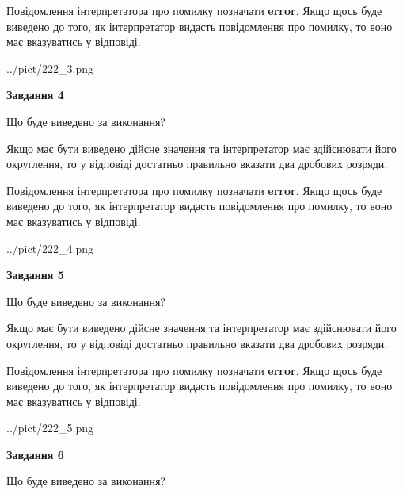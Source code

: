 \documentclass[12pt, ukrainian]{article}
\begin{document}
{\begin {Large}
Повідомлення інтерпретатора про помилку позначати \textbf{error}.
Якщо щось буде виведено до того, як інтерпретатор видасть повідомлення про помилку, 
то воно має вказуватись у відповіді. \par

\begin{center}
	{../pict/222_3.png}
\end{center}
\newpage

{\begin {center}\textbf{Завдання 4}\end {center}}\par
Що буде виведено за виконання? \par

Якщо має бути виведено дійсне значення та інтерпретатор має здійснювати його округлення, 
то у відповіді достатньо правильно вказати два дробових розряди.

Повідомлення інтерпретатора про помилку позначати \textbf{error}.
Якщо щось буде виведено до того, як інтерпретатор видасть повідомлення про помилку, 
то воно має вказуватись у відповіді. \par

\begin{center}
	{../pict/222_4.png}
\end{center}
\newpage

{\begin {center}\textbf{Завдання 5}\end {center}}\par
Що буде виведено за виконання? \par

Якщо має бути виведено дійсне значення та інтерпретатор має здійснювати його округлення, 
то у відповіді достатньо правильно вказати два дробових розряди.

Повідомлення інтерпретатора про помилку позначати \textbf{error}.
Якщо щось буде виведено до того, як інтерпретатор видасть повідомлення про помилку, 
то воно має вказуватись у відповіді. \par

\begin{center}
	{../pict/222_5.png}
\end{center}
\newpage

{\begin {center}\textbf{Завдання 6}\end {center}}\par
Що буде виведено за виконання? \par


\end{Large}}
\end{document}
